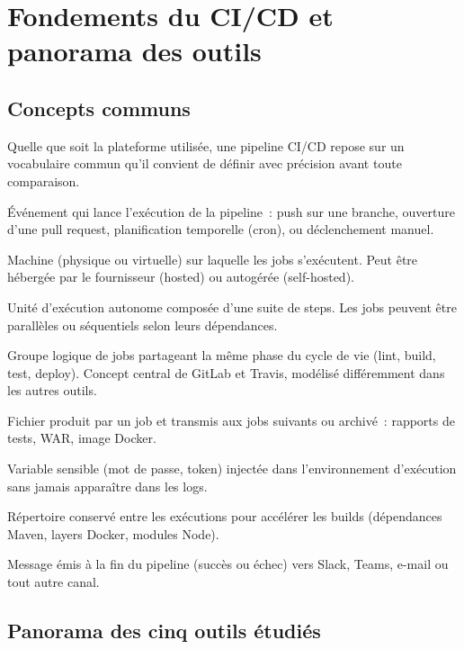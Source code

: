 \documentclass[12pt,a4paper]{report}
\begin{document}
\chapter{Fondements du CI/CD et panorama des outils}
\label{ch:fondements}

\section{Concepts communs}

Quelle que soit la plateforme utilisée, une pipeline CI/CD repose sur un
vocabulaire commun qu'il convient de définir avec précision avant toute
comparaison.

\begin{description}[leftmargin=2cm, style=nextline]
  \item[Déclencheur (trigger)] Événement qui lance l'exécution de la pipeline~:
        push sur une branche, ouverture d'une pull request, planification
        temporelle (cron), ou déclenchement manuel.
  \item[Runner / Agent] Machine (physique ou virtuelle) sur laquelle les jobs
        s'exécutent. Peut être hébergée par le fournisseur (hosted) ou
        autogérée (self-hosted).
  \item[Job] Unité d'exécution autonome composée d'une suite de steps. Les
        jobs peuvent être parallèles ou séquentiels selon leurs dépendances.
  \item[Stage] Groupe logique de jobs partageant la même phase du cycle de vie
        (lint, build, test, deploy). Concept central de GitLab et Travis,
        modélisé différemment dans les autres outils.
  \item[Artefact] Fichier produit par un job et transmis aux jobs suivants ou
        archivé~: rapports de tests, WAR, image Docker.
  \item[Secret] Variable sensible (mot de passe, token) injectée dans
        l'environnement d'exécution sans jamais apparaître dans les logs.
  \item[Cache] Répertoire conservé entre les exécutions pour accélérer les
        builds (dépendances Maven, layers Docker, modules Node).
  \item[Notification] Message émis à la fin du pipeline (succès ou échec) vers
        Slack, Teams, e-mail ou tout autre canal.
\end{description}

\section{Panorama des cinq outils étudiés}
\end{document}
